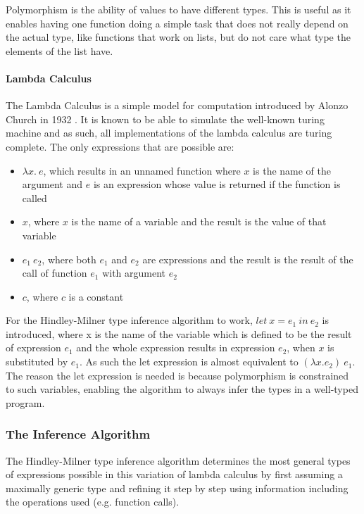 \documentclass[12pt]{article}
\begin{document}
Polymorphism is the ability of values to have different types. This
is useful as it enables having one function doing a simple task that does not
really depend on the actual type, like functions that work on lists, but do not
care what type the elements of the list have.

\paragraph{Lambda Calculus}
The Lambda Calculus is a simple model for computation introduced by Alonzo Church in 1932
\autocite{churchSetPostulatesFoundation1932}.
It is known to be
able to simulate the well-known turing machine \autocite{turingComputabilityLdefinability1937} and as such,
all implementations of the lambda calculus are turing complete.
The only expressions that are possible are:
\begin{itemize}
	\item $\lambda x.\:e$,
	      which results in an unnamed function where $x$ is the name of the argument
	      and $e$ is an expression whose value is returned if the function is called
	\item $x$, where $x$ is the name of a variable
	      and the result is the value of that variable
	\item $e_1\:e_2$, where both $e_1$ and $e_2$ are expressions and the result
	      is the result of the call of function $e_1$ with argument $e_2$\item $c$, where $c$ is a constant
\end{itemize}

For the Hindley-Milner type inference algorithm to work,
$let\:x = e_1\:in\:e_2$ is introduced, where x is the name of the variable
which is defined to be the result of expression $e_1$
and the whole expression results in expression $e_2$,
when $x$ is substituted by $e_1$.
As such the let expression is almost equivalent to $(\lambda x. e_2)\:e_1$.
The reason the let expression is needed is because polymorphism is constrained
to such variables, enabling the algorithm to always infer the types
in a well-typed program.

\subsubsection{The Inference Algorithm}
The Hindley-Milner type inference algorithm determines the most general types of expressions possible
in this variation of lambda calculus by first assuming a maximally generic type and refining it step by step
using information including the operations used (e.g. function calls).
\end{document}
